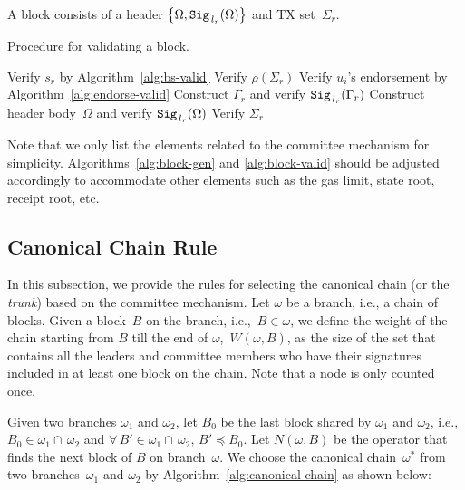 \documentclass{article}
\begin{document}
A block consists of a header $\left\{\Omega,{\tt Sig}_{\,l_r}(\Omega)\right\}$ and TX set~$\Sigma_r$.

\begin{algorithm}[H]
\caption{Procedure for validating a block.}
\label{alg:block-valid}
\begin{spacing}{1.2}
\begin{algorithmic}[1]
    \vspace{1ex}
    \State Verify $s_r$ by Algorithm~\ref{alg:bs-valid}
    \State Verify $\rho\left(\Sigma_r\right)$
        \State Verify $u_i$'s endorsement by Algorithm~\ref{alg:endorse-valid}
    \EndFor
    \State Construct $\Gamma_r$ and verify ${\tt Sig}_{\,l_r}(\Gamma_r)$
    \State Construct header body~$\Omega$ and verify ${\tt Sig}_{\,l_r}(\Omega)$
    \State Verify $\Sigma_r$ 
\end{algorithmic}
\end{spacing}
\end{algorithm}

Note that we only list the elements related to the committee mechanism for simplicity. Algorithms~\ref{alg:block-gen} and \ref{alg:block-valid} should be adjusted accordingly to accommodate other elements such as the gas limit, state root, receipt root, etc.

\subsection{Canonical Chain Rule}
In this subsection, we provide the rules for selecting the canonical chain (or the \textit{trunk}) based on the committee mechanism. Let $\omega$ be a branch, i.e., a chain of blocks. Given a block~$B$ on the branch, i.e.,~$B\in\omega$, we define the weight of the chain starting from $B$ till the end of $\omega$,~$W(\omega,B)$, as the size of the set that contains all the leaders and committee members who have their signatures included in at least one block on the chain. Note that a node is only counted once.

Given two branches $\omega_1$ and $\omega_2$, let $B_0$ be the last block shared by $\omega_1$ and $\omega_2$, i.e., $B_0\in\omega_1\cap\,\omega_2$ and $\forall\, B'\in\omega_1\cap\,\omega_2,\, B'\preceq B_0$. Let $N(\omega,B)$ be the operator that finds the next block of $B$ on branch~$\omega$. We choose the canonical chain~$\omega^*$ from two branches~$\omega_1$ and $\omega_2$ by Algorithm~\ref{alg:canonical-chain} as shown below:
\end{document}
